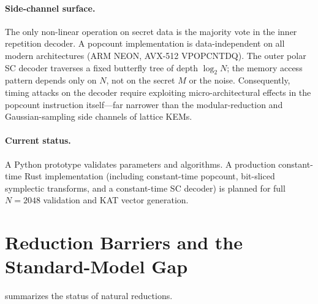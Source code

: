 \documentclass[11pt,a4paper]{article}
\theoremstyle{plain}
\theoremstyle{definition}
\begin{document}
\paragraph{Side-channel surface.}
The only non-linear operation on secret data is the majority vote in the inner repetition decoder. A popcount implementation is data-independent on all modern architectures (ARM NEON, AVX-512 VPOPCNTDQ). The outer polar SC decoder traverses a fixed butterfly tree of depth $\log_2 N$; the memory access pattern depends only on $N$, not on the secret $M$ or the noise. Consequently, timing attacks on the decoder require exploiting micro-architectural effects in the popcount instruction itself---far narrower than the modular-reduction and Gaussian-sampling side channels of lattice KEMs.

\paragraph{Current status.} A Python prototype validates parameters and algorithms. A production constant-time Rust implementation (including constant-time popcount, bit-sliced symplectic transforms, and a constant-time SC decoder) is planned for full $N=2048$ validation and KAT vector generation.

\section{Reduction Barriers and the Standard-Model Gap}
\label{sec:barriers}

 summarizes the status of natural reductions.
\end{document}
